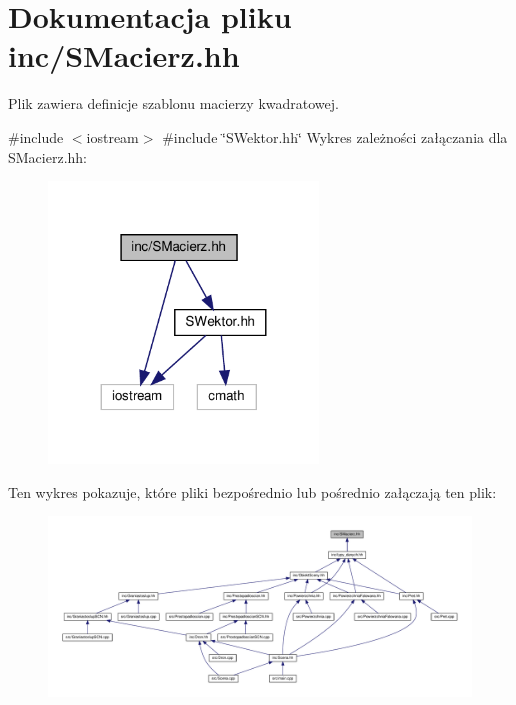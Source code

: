 \hypertarget{SMacierz_8hh}{}\section{Dokumentacja pliku inc/\+S\+Macierz.hh}
\label{SMacierz_8hh}


Plik zawiera definicje szablonu macierzy kwadratowej.  


{\ttfamily \#include $<$iostream$>$}\newline
{\ttfamily \#include \char`\"{}S\+Wektor.\+hh\char`\"{}}\newline
Wykres zależności załączania dla S\+Macierz.\+hh\+:\nopagebreak
\begin{figure}[H]
\begin{center}
\leavevmode
\includegraphics[width=203pt]{SMacierz_8hh__incl}
\end{center}
\end{figure}
Ten wykres pokazuje, które pliki bezpośrednio lub pośrednio załączają ten plik\+:\nopagebreak
\begin{figure}[H]
\begin{center}
\leavevmode
\includegraphics[width=350pt]{SMacierz_8hh__dep__incl}
\end{center}
\end{figure}
